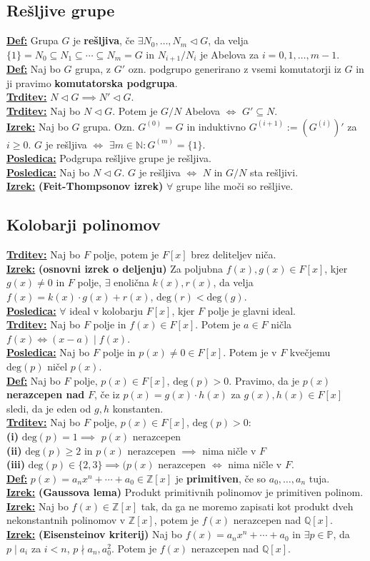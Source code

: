 \documentclass[a4paper,oneside,8pt,landscape]{extarticle}
\let\oldtextbf\textbf
\renewcommand{\textbf}[1]{\oldtextbf{\boldmath #1}}
\newcommand{\definicija}[1]{\textbf{\underline{Def:} }{#1}\\}
\newcommand{\trditev}[1]{\textbf{\underline{Trditev:} }{#1}\\}
\newcommand{\posledica}[1]{\textbf{\underline{Posledica:} }{#1}\\}
\newcommand{\izrek}[1]{\textbf{\underline{Izrek:} }{#1}\\}
\newcommand{\bt}[1]{\textbf{#1}}
\begin{document}
\begin{multicols*}{3}
\subsection*{Rešljive grupe}
\definicija{Grupa $G$ je \bt{rešljiva}, če $\exists N_0,\dots,N_m\triangleleft G$, da velja $\{1\} = N_0\subseteq N_1\subseteq \cdots \subseteq N_m = G$ in $N_{i+1}/N_i$ je Abelova za $i=0,1,\dots,m-1$.}
\definicija{Naj bo $G$ grupa, z $G'$ ozn. podgrupo generirano z vsemi komutatorji iz $G$ in ji pravimo \bt{komutatorska podgrupa}.}
\trditev{$N\triangleleft G \implies N'\triangleleft G$.}
\trditev{Naj bo $N\triangleleft G$. Potem je $G/N$ Abelova $\iff$ $G'\subseteq N$.}
\izrek{Naj bo $G$ grupa. Ozn. $G^{(0)} = G$ in induktivno $G^{(i+1)} := (G^{(i)})'$ za $i\geq 0$. $G$ je rešljiva $\iff$ $\exists m\in \mathbb{N}: G^{(m)} = \{1\}.$}
\posledica{Podgrupa rešljive grupe je rešljiva.}
\posledica{Naj bo $N\triangleleft G$. $G$ je rešljiva $\iff$ $N$ in $G/N$ sta rešljivi.}
\izrek{\bt{(Feit-Thompsonov izrek)} $\forall$ grupe lihe moči so rešljive.}
\vspace{-15pt}
\subsection*{Kolobarji polinomov}
\trditev{Naj bo $F$ polje, potem je $F[x]$ brez deliteljev niča.}
\izrek{\bt{(osnovni izrek o deljenju)} Za poljubna $f(x),g(x)\in F[x]$, kjer $g(x)\neq 0$ in $F$ polje, $\exists$ enolična $k(x),r(x)$, da velja $f(x) = k(x)\cdot g(x) + r(x)$, $\text{deg}(r) < \text{deg}(g)$.}
\posledica{$\forall$ ideal v kolobarju $F[x]$, kjer $F$ polje je glavni ideal.}
\trditev{Naj bo $F$ polje in $f(x)\in F[x]$. Potem je $a\in F$ ničla $f(x) \iff (x-a) \mid f(x)$.}
\posledica{Naj bo $F$ polje in $p(x)\neq 0\in F[x]$. Potem je v $F$ kvečjemu $\text{deg}(p)$ ničel $p(x)$.}
\definicija{Naj bo $F$ polje, $p(x)\in F[x]$, $\text{deg}(p)>0$. Pravimo, da je $p(x)$ \bt{nerazcepen nad} $F$, če iz $p(x)=g(x)\cdot h(x)$ za $g(x),h(x)\in F[x]$ sledi, da je eden od $g,h$ konstanten.}
\trditev{Naj bo $F$ polje, $p(x)\in F[x]$, $\text{deg}(p)>0$: \\
\bt{(i)} $\text{deg}(p)=1\implies$ $p(x)$ nerazcepen \\
\bt{(ii)} $\text{deg}(p)\geq2$ in $p(x)$ nerazcepen $\implies$ nima ničle v $F$ \\
\bt{(iii)} $\text{deg}(p)\in\{2,3\}\implies (p(x)\text{ nerazcepen } \iff $ nima ničle v $F$.}
\definicija{$p(x) = a_nx^n+\cdots + a_0\in \mathbb{Z}[x]$ je \bt{primitiven}, če so $a_0,\dots, a_n$ tuja.}
\izrek{\bt{(Gaussova lema)} Produkt primitivnih polinomov je primitiven polinom.}
\izrek{Naj bo $f(x)\in \mathbb{Z}[x]$ tak, da ga ne moremo zapisati kot produkt dveh nekonstantnih polinomov v $\mathbb{Z}[x]$, potem je $f(x)$ nerazcepen nad $\mathbb{Q}[x]$.}
\izrek{\bt{(Eisensteinov kriterij)} Naj bo $f(x) = a_nx^n+\cdots +a_0$ in $\exists p\in\mathbb{P}$, da $p\mid a_i$ za $i<n$, $p\nmid a_n,a_0^2$. Potem je $f(x)$ nerazcepen nad $\mathbb{Q}[x]$.}
\vspace{-15pt}

\end{multicols*}
\end{document}
